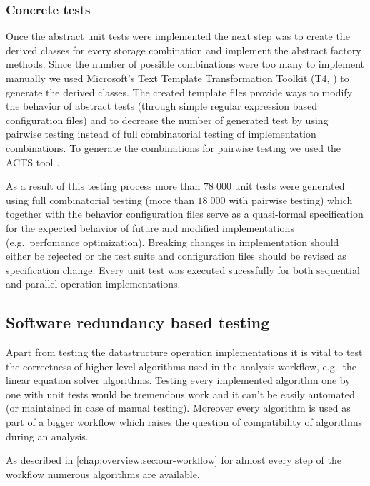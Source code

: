 \subsubsection{Concrete tests}

Once the abstract unit tests were implemented the next step was to create the derived classes for every storage combination and implement the abstract factory methods. Since the number of possible combinations were too many to implement manually we used Microsoft's Text Template Transformation Toolkit (T4, \citep{T4}) to generate the derived classes. The created template files provide ways to modify the behavior of abstract tests (through simple regular expression based configuration files) and to decrease the number of generated test by using pairwise testing instead of full combinatorial testing of implementation combinations. To generate the combinations for pairwise testing we used the ACTS tool \citep{borazjany2012combinatorial}. 

As a result of this testing process more than $78\;000$ unit tests were generated using full combinatorial testing (more than $18\;000$ with pairwise testing) which together with the behavior configuration files serve as a quasi-formal specification for the expected behavior of future and modified implementations (e.g.\ perfomance optimization). Breaking changes in implementation should either be rejected or the test suite and configuration files should be revised as specification change. Every unit test was executed sucessfully for both sequential and parallel operation implementations.

\subsection{Software redundancy based testing}

Apart from testing the datastructure operation implementations it is vital to test the correctness of higher level algorithms used in the analysis workflow, e.g.\ the linear equation solver algorithms. Testing every implemented algorithm one by one with unit tests would be tremendous work and it can't be easily automated (or maintained in case of manual testing). Moreover every algorithm is used as part of a bigger workflow which raises the question of compatibility of algorithms during an analysis. 

As described in \cref{chap:overview:sec:our-workflow} for almost every step of the workflow numerous algorithms are available.

